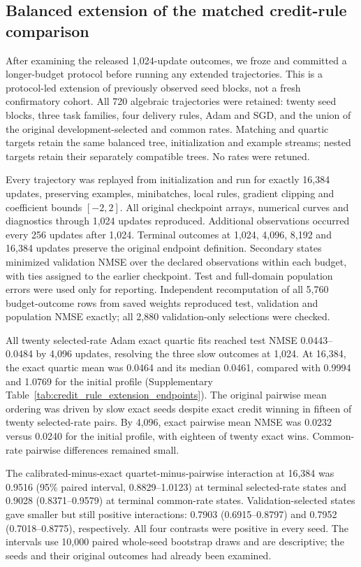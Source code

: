 \subsection{Balanced extension of the matched credit-rule comparison}
\label{sec:credit_rule_extension}

After examining the released 1,024-update outcomes, we froze and committed a longer-budget protocol before running any extended trajectories. This is a protocol-led extension of previously observed seed blocks, not a fresh confirmatory cohort. All 720 algebraic trajectories were retained: twenty seed blocks, three task families, four delivery rules, Adam and SGD, and the union of the original development-selected and common rates. Matching and quartic targets retain the same balanced tree, initialization and example streams; nested targets retain their separately compatible trees. No rates were retuned.

Every trajectory was replayed from initialization and run for exactly 16,384 updates, preserving examples, minibatches, local rules, gradient clipping and coefficient bounds $[-2,2]$. All original checkpoint arrays, numerical curves and diagnostics through 1,024 updates reproduced. Additional observations occurred every 256 updates after 1,024. Terminal outcomes at 1,024, 4,096, 8,192 and 16,384 updates preserve the original endpoint definition. Secondary states minimized validation NMSE over the declared observations within each budget, with ties assigned to the earlier checkpoint. Test and full-domain population errors were used only for reporting. Independent recomputation of all 5,760 budget-outcome rows from saved weights reproduced test, validation and population NMSE exactly; all 2,880 validation-only selections were checked.

All twenty selected-rate Adam exact quartic fits reached test NMSE 0.0443--0.0484 by 4,096 updates, resolving the three slow outcomes at 1,024. At 16,384, the exact quartic mean was 0.0464 and its median 0.0461, compared with 0.9994 and 1.0769 for the initial profile (Supplementary Table~\ref{tab:credit_rule_extension_endpoints}). The original pairwise mean ordering was driven by slow exact seeds despite exact credit winning in fifteen of twenty selected-rate pairs. By 4,096, exact pairwise mean NMSE was 0.0232 versus 0.0240 for the initial profile, with eighteen of twenty exact wins. Common-rate pairwise differences remained small.

The calibrated-minus-exact quartet-minus-pairwise interaction at 16,384 was 0.9516 (95\% paired interval, 0.8829--1.0123) at terminal selected-rate states and 0.9028 (0.8371--0.9579) at terminal common-rate states. Validation-selected states gave smaller but still positive interactions: 0.7903 (0.6915--0.8797) and 0.7952 (0.7018--0.8775), respectively. All four contrasts were positive in every seed. The intervals use 10,000 paired whole-seed bootstrap draws and are descriptive; the seeds and their original outcomes had already been examined.

